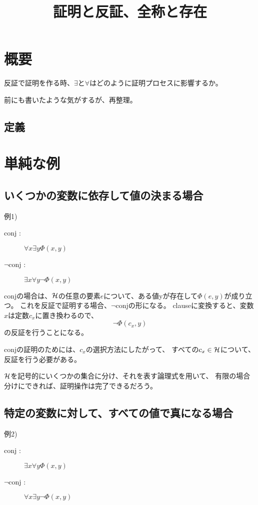\documentclass[10pt, oneside]{jarticle}   	%
\title{証明と反証、全称と存在}
\author{\myname}
\begin{document}
\maketitle

\section{概要}
反証で証明を作る時、$\exists$と$\forall$はどのように証明プロセスに影響するか。

前にも書いたような気がするが、再整理。

\subsection{定義}
%


\section{単純な例}
\subsection{いくつかの変数に依存して値の決まる場合}
例1)
\begin{description}
\item[ conj :] $\forall x \exists y \Phi(x,y)$
\item[ $\neg$conj :]  $\exists x \forall y \neg \Phi(x,y)$
\end{description}

conjの場合は、$\mathcal{H}$の任意の要素$e$について、ある値yが存在して$\Phi(e,y)$が成り立つ。
これを反証で証明する場合、$\neg$conjの形になる。
clauseに変換すると、変数$x$は定数$c_x$に置き換わるので、
$$\neg \Phi(c_x, y)$$
の反証を行うことになる。

conjの証明のためには、$c_x$の選択方法にしたがって、
すべての$c_x \in \mathcal{H}$について、反証を行う必要がある。

$\mathcal{H}$を記号的にいくつかの集合に分け、それを表す論理式を用いて、
有限の場合分けにできれば、証明操作は完了できるだろう。

\subsection{特定の変数に対して、すべての値で真になる場合}
例2)
\begin{description}
\item[ conj :] $\exists x \forall y \Phi(x,y)$
\item[ $\neg$conj :]  $\forall x \exists y \neg \Phi(x,y)$
\end{description}
\end{document}
